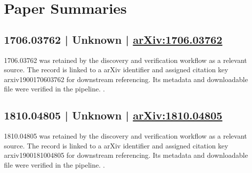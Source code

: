 \documentclass[11pt]{article}
\begin{document}
\section*{Paper Summaries}

\subsection*{1706.03762 | Unknown | \href{https://arxiv.org/abs/1706.03762}{arXiv:1706.03762}}

1706.03762 was retained by the discovery and verification workflow as a relevant source. The record is linked to a arXiv identifier and assigned citation key arxiv1900170603762 for downstream referencing. Its metadata and downloadable file were verified in the pipeline. \cite{arxiv1900170603762}.

\subsection*{1810.04805 | Unknown | \href{https://arxiv.org/abs/1810.04805}{arXiv:1810.04805}}

1810.04805 was retained by the discovery and verification workflow as a relevant source. The record is linked to a arXiv identifier and assigned citation key arxiv1900181004805 for downstream referencing. Its metadata and downloadable file were verified in the pipeline. \cite{arxiv1900181004805}.



\end{document}
